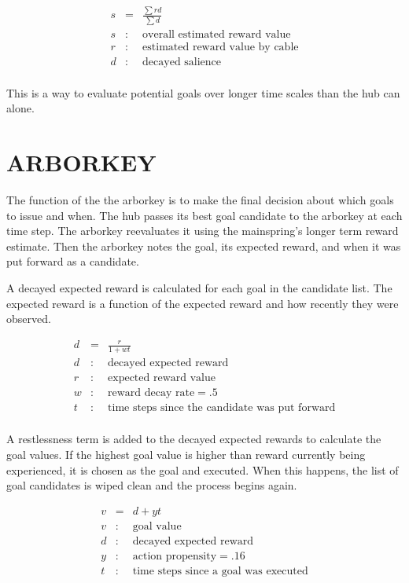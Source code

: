 \documentclass[oneside,twocolumn]{article}
\begin{document}
\begin{eqnarray*}
s &= & \frac {\sum rd}{\sum d}\\ 
s &:& \mbox{overall estimated reward value} \\
r &:& \mbox{estimated reward value by cable} \\
d &:& \mbox{decayed salience} \\
\end{eqnarray*}

This is a way to evaluate potential goals over longer time scales than the hub can alone.

\section*{\color{copper} ARBORKEY}

The function of the the arborkey is to make the final decision about which goals to issue and when. The hub passes its best goal candidate to the arborkey at each time step. The arborkey reevaluates it using the mainspring's longer term reward estimate. Then the arborkey notes the goal, its expected reward, and when it was put forward as a candidate.

A decayed expected reward is calculated for each goal in the candidate list. The expected reward is a function of the expected reward and how recently they were observed. 

\begin{eqnarray*}
d &=& \frac {r}{1 + wt}\\
d &:& \mbox{decayed expected reward} \\
r &:& \mbox{expected reward value} \\
w &:& \mbox{reward decay rate} = .5 \\
t &:& \mbox{time steps since the candidate was put forward}\\
\end{eqnarray*}

A restlessness term is added to the decayed expected rewards to calculate the goal values. If the highest goal value is higher than reward currently being experienced, it is chosen as the goal and executed. When this happens, the list of goal candidates is wiped clean and the process begins again. 


\begin{eqnarray*}
v &=& d + yt\\
v &:& \mbox{goal value} \\
d &:& \mbox{decayed expected reward} \\
y &:& \mbox{action propensity} = .16 \\
t &:& \mbox{time steps since a goal was executed}\\
\end{eqnarray*}
\end{document}
